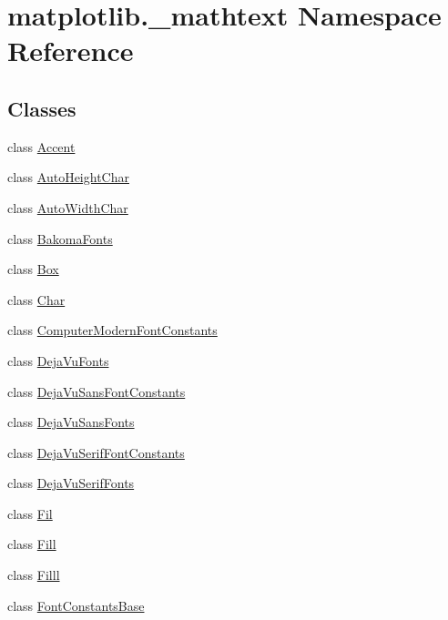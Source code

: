 \hypertarget{namespacematplotlib_1_1__mathtext}{}\section{matplotlib.\+\_\+mathtext Namespace Reference}
\label{namespacematplotlib_1_1__mathtext}
\subsection*{Classes}
\begin{DoxyCompactItemize}
\item 
class \hyperlink{classmatplotlib_1_1__mathtext_1_1Accent}{Accent}
\item 
class \hyperlink{classmatplotlib_1_1__mathtext_1_1AutoHeightChar}{Auto\+Height\+Char}
\item 
class \hyperlink{classmatplotlib_1_1__mathtext_1_1AutoWidthChar}{Auto\+Width\+Char}
\item 
class \hyperlink{classmatplotlib_1_1__mathtext_1_1BakomaFonts}{Bakoma\+Fonts}
\item 
class \hyperlink{classmatplotlib_1_1__mathtext_1_1Box}{Box}
\item 
class \hyperlink{classmatplotlib_1_1__mathtext_1_1Char}{Char}
\item 
class \hyperlink{classmatplotlib_1_1__mathtext_1_1ComputerModernFontConstants}{Computer\+Modern\+Font\+Constants}
\item 
class \hyperlink{classmatplotlib_1_1__mathtext_1_1DejaVuFonts}{Deja\+Vu\+Fonts}
\item 
class \hyperlink{classmatplotlib_1_1__mathtext_1_1DejaVuSansFontConstants}{Deja\+Vu\+Sans\+Font\+Constants}
\item 
class \hyperlink{classmatplotlib_1_1__mathtext_1_1DejaVuSansFonts}{Deja\+Vu\+Sans\+Fonts}
\item 
class \hyperlink{classmatplotlib_1_1__mathtext_1_1DejaVuSerifFontConstants}{Deja\+Vu\+Serif\+Font\+Constants}
\item 
class \hyperlink{classmatplotlib_1_1__mathtext_1_1DejaVuSerifFonts}{Deja\+Vu\+Serif\+Fonts}
\item 
class \hyperlink{classmatplotlib_1_1__mathtext_1_1Fil}{Fil}
\item 
class \hyperlink{classmatplotlib_1_1__mathtext_1_1Fill}{Fill}
\item 
class \hyperlink{classmatplotlib_1_1__mathtext_1_1Filll}{Filll}
\item 
class \hyperlink{classmatplotlib_1_1__mathtext_1_1FontConstantsBase}{Font\+Constants\+Base}

\end{DoxyCompactItemize}
